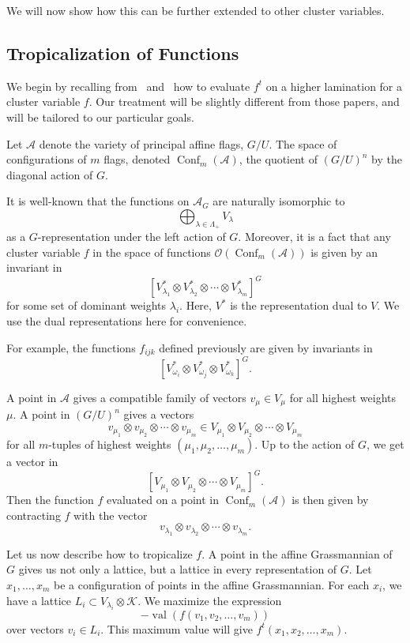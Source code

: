 \documentclass[10pt]{amsart}
\theoremstyle{definition}
\newcommand{\A}{\mathcal{A}}
\newcommand{\val}{\operatorname{val}}
\newcommand{\Conf}{\operatorname{Conf}}
\begin{document}
We will now show how this can be further extended to other cluster variables.

\subsection{Tropicalization of Functions}

We begin by recalling from~\cite{GS} and~\cite{Le} how to evaluate $f^t$ on a higher lamination for a cluster variable $f$. Our treatment will be slightly different from those papers, and will be tailored to our particular goals.

Let $\A$ denote the variety of principal affine flags, $G/U$. The space of configurations of $m$ flags, denoted $\Conf_m (\A)$, the quotient of $(G/U)^n$ by the diagonal action of $G$. 

It is well-known that the functions on $\A_G$ are naturally isomorphic to 
\[
\bigoplus_{\lambda \in \Lambda_+} V_{\lambda}
\]
as a $G$-representation under the left action of $G$. Moreover, it is a fact that any cluster variable $f$ in the space of functions $\mathcal{O}(\Conf_m (\A))$ is given by an invariant in
\[
[V_{\lambda_1}^* \otimes V_{\lambda_2}^* \otimes \cdots \otimes V_{\lambda_m}^*]^G
\]
for some set of dominant weights $\lambda_i$. Here, $V^*$ is the representation dual to $V$. We use the dual representations here for convenience.

For example, the functions $f_{ijk}$ defined previously are given by invariants in 
\[
[V_{\omega_i}^* \otimes V_{\omega_j}^* \otimes V_{\omega_k}^*]^G.
\]

A point in $\A$ gives a compatible family of vectors $v_{\mu} \in V_{\mu}$ for all highest weights $\mu$. A point in $(G/U)^n$ gives a vectors 
\[
v_{\mu_1} \otimes v_{\mu_2} \otimes \cdots \otimes v_{\mu_m} \in V_{\mu_1} \otimes V_{\mu_2} \otimes \cdots \otimes V_{\mu_m}
\]
for all $m$-tuples of highest weights $(\mu_1, \mu_2, \dots, \mu_m)$. Up to the action of $G$, we get a vector in
\[
[V_{\mu_1} \otimes V_{\mu_2} \otimes \cdots \otimes V_{\mu_m}]^G.
\]
Then the function $f$ evaluated on a point in $\Conf_m (\A)$ is then given by contracting $f$ with the vector 
\[
v_{\lambda_1} \otimes v_{\lambda_2} \otimes \cdots \otimes v_{\lambda_m}.
\]

Let us now describe how to tropicalize $f$. 
A point in the affine Grassmannian of $G$ gives us not only a lattice, but a lattice in every representation of $G$. Let $x_1, \dots, x_m$ be a configuration of points in the affine Grassmannian. For each $x_i$, we have a lattice $L_i \subset V_{\lambda_i} \otimes \mathcal{K}$. We maximize the expression
\[
-\val(f(v_1, v_2, \dots, v_m))
\]
over vectors $v_i \in L_i$. This maximum value will give $f^t(x_1, x_2, \dots, x_m)$.
\end{document}
